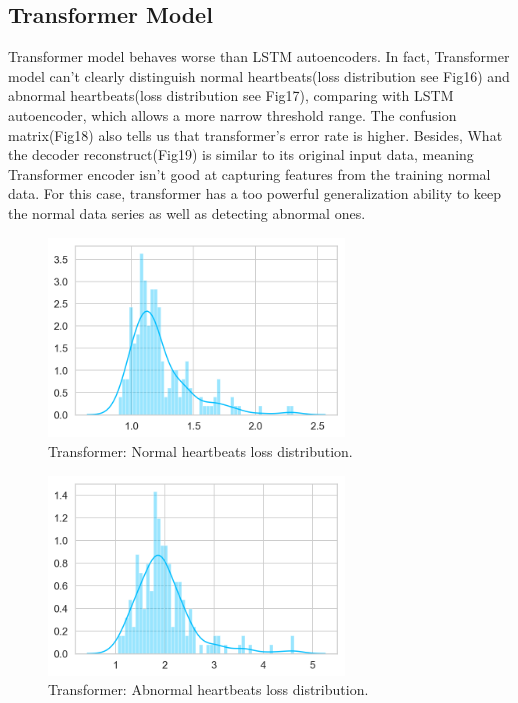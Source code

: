 \documentclass{article}
\begin{document}
\subsection{Transformer Model}
Transformer model behaves worse than LSTM autoencoders. In fact, Transformer model can't clearly distinguish normal heartbeats(loss distribution see Fig16) and abnormal heartbeats(loss distribution see Fig17), comparing with LSTM autoencoder, which allows a more narrow threshold range. The confusion matrix(Fig18) also tells us that transformer's error rate is higher. Besides, What the decoder reconstruct(Fig19) is similar to its original input data, meaning Transformer encoder isn't good at capturing features from the training normal data. For this case, transformer has a too powerful generalization ability to keep the normal data series as well as detecting abnormal ones.
\begin{figure}[!t]
    \centering
    \includegraphics[width=0.7\textwidth]{images/transformer_normal.png}
    \caption{Transformer: Normal heartbeats loss distribution.}
\end{figure}
\begin{figure}[!t]
    \centering
    \includegraphics[width=0.7\textwidth]{images/transformer_abnormal.png}
    \caption{Transformer: Abnormal heartbeats loss distribution.}
\end{figure}
\end{document}
